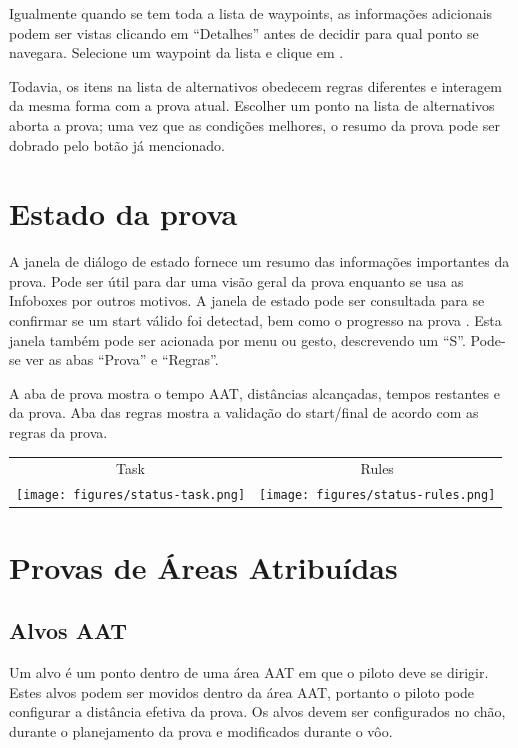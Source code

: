 Igualmente quando se tem toda a lista de waypoints, as informações adicionais podem ser vistas clicando em “Detalhes” antes de decidir para qual ponto se navegara.  Selecione um waypoint da lista e clique em .

Todavia, os itens na lista de alternativos obedecem regras diferentes e interagem da mesma forma com a prova atual.  Escolher um ponto na lista de alternativos aborta a prova; uma vez que as condições melhores, o resumo da prova pode ser dobrado pelo botão já mencionado.


\section{Estado da prova }\label{sec:task-status}

A janela de diálogo de estado fornece um resumo das informações importantes da prova.   
 Pode ser útil para dar uma visão geral da prova enquanto se usa as Infoboxes por outros motivos.  A janela de estado pode ser consultada para se confirmar se um start válido foi detectad, bem como o progresso na prova
.  Esta janela também pode ser acionada por menu ou gesto, descrevendo um “S”.   Pode-se ver as abas “Prova” e “Regras”.

A aba de prova mostra o tempo AAT, distâncias alcançadas, tempos restantes e da prova.  Aba das regras mostra a validação do start/final de acordo com as regras da prova.

\begin{center}
\begin{tabular}{c c}
Task & Rules \\
\texttt{[image: figures/status-task.png]} &
\texttt{[image: figures/status-rules.png]} \\
\end{tabular}
\end{center}

\section{Provas de Áreas Atribuídas}\label{sec:aat-tasks}

\subsection*{Alvos AAT}

Um alvo é um ponto dentro de uma área AAT em que o piloto deve se dirigir.  Estes alvos podem ser movidos dentro da área AAT, portanto o piloto pode configurar a distância efetiva da prova.  Os alvos devem ser configurados no chão, durante o planejamento da prova e modificados durante o vôo.

